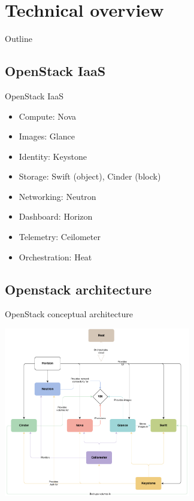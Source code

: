 
\section{Technical overview}
\begin{frame}{Outline}
\end{frame}

\subsection{OpenStack IaaS}
\begin{frame}{OpenStack IaaS}
  \begin{itemize}
    \item Compute: Nova
    \item Images: Glance
    \item Identity: Keystone
    \item Storage: Swift (object), Cinder (block)
    \item Networking: Neutron
    \item Dashboard: Horizon
    \item Telemetry: Ceilometer
    \item Orchestration: Heat
  \end{itemize}
\end{frame}

\subsection{Openstack architecture}
\begin{frame}{OpenStack conceptual architecture}
  \begin{center}
    \includegraphics[width=22em]{img/openstack_havana_conceptual_arch}
  \end{center}
\end{frame}

